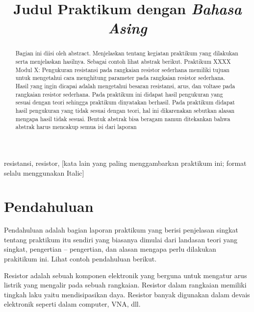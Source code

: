 \documentclass[conference]{IEEEtran}
\begin{document}
\title{Judul Praktikum dengan \emph{Bahasa Asing}}


\author{
}

\maketitle
\thispagestyle{fancy}
\setlength{\parskip}{12pt}
\setlength{\parindent}{12pt}

\begin{abstract}
Bagian ini diisi oleh abstract. Menjelaskan tentang kegiatan praktikum yang dilakukan serta menjelaskan hasilnya. Sebagai contoh lihat abstrak berikut. Praktikum XXXX Modul X: Pengukuran resistansi pada rangkaian resistor sederhana memiliki tujuan untuk mengetahui cara menghitung parameter pada rangkaian resistor sederhana. Hasil yang ingin dicapai adalah mengetahui besaran resistansi, arus, dan voltase pada rangkaian resistor sederhana. Pada praktikum ini didapat hasil pengukuran yang sesuai dengan teori sehingga praktikum dinyatakan berhasil. Pada praktikum didapat hasil pengukuran yang tidak sesuai dengan teori, hal ini dikarenakan {sebutkan alasan mengapa hasil tidak sesuai}. Bentuk abstrak bisa beragam namun ditekankan bahwa abstrak harus mencakup semua isi dari laporan 
\end{abstract}

\begin{IEEEkeywords}
resistansi, resistor, [kata lain yang paling menggambarkan praktikum ini; format selalu menggunakan Italic]
\end{IEEEkeywords}

\setlength{\parskip}{6pt}
\setlength{\parindent}{12pt}

\section{Pendahuluan}
Pendahuluan adalah bagian laporan praktikum yang berisi penjelasan singkat tentang praktikum itu sendiri yang biasanya dimulai dari landasan teori yang singkat, pengertian – pengertian, dan alasan mengapa perlu dilakukan prakitikum ini. Lihat contoh pendahuluan berikut.

Resistor adalah sebuah komponen elektronik yang berguna untuk mengatur arus listrik yang mengalir pada sebuah rangkaian. Resistor dalam rangkaian memiliki tingkah laku yaitu mendisipasikan daya. Resistor banyak digunakan dalam devais elektronik seperti dalam computer, VNA, dll.
\end{document}

